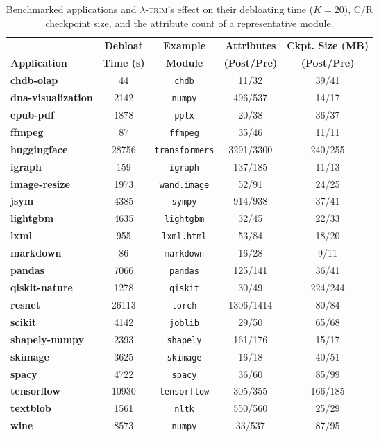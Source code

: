 \documentclass[sigplan,screen]{acmart}
\newcommand{\sys}{\textsc{\ensuremath{\lambda}-trim}\xspace}
\newcommand{\application}[1]{{\textcolor{pennblue}{\textbf{#1}}}}
\newcommand{\module}[1]{{\texttt{#1}}}
\begin{document}
\begin{table}[t]
    \centering
    \setlength{\tabcolsep}{3pt}
    \scriptsize
        \begin{tabularx}{\columnwidth}{Xcccc}
        \toprule
        & \textbf{Debloat} & \textbf{Example} & \textbf{Attributes} & \textbf{Ckpt. Size (MB)} \\
\textbf{Application}  & \textbf{Time (s)} & \textbf{Module} & \textbf{(Post/Pre)} & \textbf{(Post/Pre)}\\
        \midrule
        \application{chdb-olap} & 44 & \module{chdb} & 11/32 & 39/41 \\
        \application{dna-visualization} & 2142 & \module{numpy} & 496/537 & 14/17 \\
        \application{epub-pdf} & 1878 & \module{pptx} & 20/38 & 36/37 \\
        \application{ffmpeg} & 87 & \module{ffmpeg} & 35/46 & 11/11 \\
        \application{huggingface} & 28756 & \module{transformers} & 3291/3300 & 240/255 \\
        \application{igraph} & 159 & \module{igraph} & 137/185 & 11/13 \\
        \application{image-resize} & 1973 & \module{wand.image} & 52/91 & 24/25 \\
        \application{jsym} & 4385 & \module{sympy} & 914/938 & 37/41 \\
        \application{lightgbm} & 4635 & \module{lightgbm} & 32/45 & 22/33 \\
        \application{lxml} & 955 & \module{lxml.html} & 53/84 & 18/20 \\
        \application{markdown} & 86 & \module{markdown} & 16/28 & 9/11 \\
        \application{pandas} & 7066 & \module{pandas} & 125/141 & 36/41 \\
        \application{qiskit-nature} & 1278 & \module{qiskit} & 30/49 & 224/244 \\
        \application{resnet} & 26113 & \module{torch} & 1306/1414 & 80/84 \\
        \application{scikit} & 4142 & \module{joblib} & 29/50 & 65/68 \\
        \application{shapely-numpy} & 2393 & \module{shapely} & 161/176 & 15/17 \\
        \application{skimage} & 3625 & \module{skimage} & 16/18 & 40/51 \\
        \application{spacy} & 4722 & \module{spacy} & 36/60 & 85/99 \\
        \application{tensorflow} & 10930 & \module{tensorflow} & 305/355 & 166/185 \\
        \application{textblob} & 1561 & \module{nltk} & 550/560 & 25/29 \\
        \application{wine} & 8573 & \module{numpy} & 33/537 & 87/95 \\
        \bottomrule
    \end{tabularx}
    \caption{Benchmarked applications and \sys's effect on their debloating time ($K=20$), C/R checkpoint size, and the attribute count of a representative module.
}
    \label{tab:debloating-time}
\end{table}  
\end{document}
